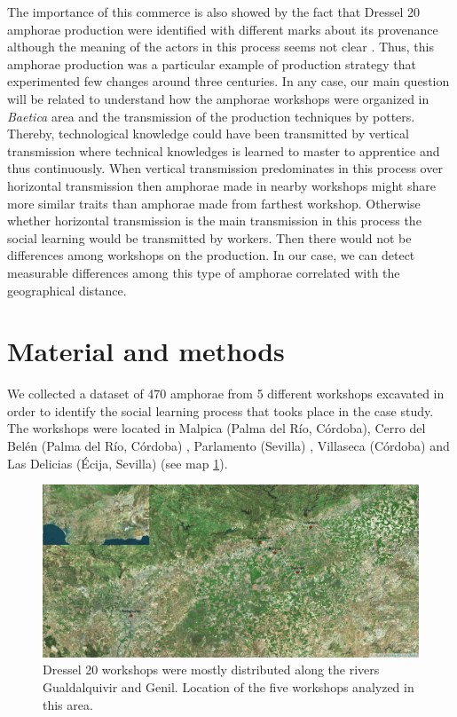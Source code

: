 \documentclass[review]{elsarticle}
\begin{document}
The importance of this commerce is also showed by the fact that Dressel 20 amphorae production were identified with different marks about its provenance although the meaning of the actors in this process seems not clear \citep{coto-sarmiento_maria_bayesian_????}. Thus, this amphorae production was a particular example of production strategy that experimented few changes around three centuries. In any case, our main question will be related to understand how the amphorae workshops were organized in \textit{Baetica} area and the transmission of the production techniques by potters. Thereby, technological knowledge could have been transmitted by vertical transmission where technical knowledges is learned to master to apprentice and thus continuously. When vertical transmission predominates in this process over horizontal transmission then amphorae made in nearby workshops might share more similar traits than amphorae made from farthest workshop. Otherwise whether horizontal transmission is the main transmission in this process the social learning would be transmitted by workers. Then there would not be differences among workshops on the production. In our case, we can detect measurable differences among this type of amphorae correlated with the geographical distance.


\section{Material and methods}

We collected a dataset of 470 amphorae from 5 different workshops excavated in order to identify the social learning process that tooks place in the case study. The workshops were located in Malpica (Palma del R\'io, C\'ordoba), Cerro del Bel\'en (Palma del R\'io, C\'ordoba) \citep{diaz_trujillo_excavacion_1992}, Parlamento (Sevilla) \citep{garcia_vargas_anforas_2000}, Villaseca (C\'ordoba)\citep{garcia_vargas_enrique_excavacion_????} and Las Delicias (\'Ecija, Sevilla) \citep{fernandez_excavacion_2001,_atelier_2014} (see map \ref{romanworkshop}).


\begin{figure}[htp]
	\centering
\includegraphics[scale=0.30]{romanworkshop.png}
\caption{Dressel 20 workshops were mostly distributed along the rivers Gualdalquivir and Genil. Location of the five workshops analyzed in this area.}
\label{romanworkshop}
\end{figure} 
\end{document}
